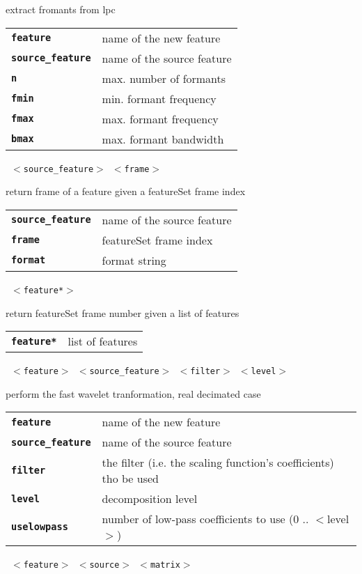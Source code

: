 \begin{description}
\begin{description}
        extract fromants from lpc

      \begin{tabular}{ll}
 \texttt{\textbf{feature}} &         name of the new feature \\
 \texttt{\textbf{source\_feature}} &  name of the source feature \\
 \texttt{\textbf{n}} &                max. number of formants  \\
 \texttt{\textbf{fmin}} &             min. formant frequency  \\
 \texttt{\textbf{fmax}} &             max. formant frequency  \\
 \texttt{\textbf{bmax}} &             max. formant bandwidth  \\
      \end{tabular}
       \texttt{ $<$source\_feature$>$ $<$frame$>$ } \

        return frame of a feature given a featureSet frame index

      \begin{tabular}{ll}
 \texttt{\textbf{source\_feature}} &  name of the source feature \\
 \texttt{\textbf{frame}} &           featureSet frame index  \\
 \texttt{\textbf{format}} &           format string  \\
      \end{tabular}
       \texttt{ $<$feature*$>$} \

        return featureSet frame number given a list of features

      \begin{tabular}{ll}
 \texttt{\textbf{feature*}} & list of features \\
      \end{tabular}
       \texttt{ $<$feature$>$ $<$source\_feature$>$ $<$filter$>$ $<$level$>$ } \

        perform the fast wavelet tranformation, real decimated case

      \begin{tabular}{ll}
 \texttt{\textbf{feature}} &         name of the new feature \\
 \texttt{\textbf{source\_feature}} &  name of the source feature \\
 \texttt{\textbf{filter}} &          the filter (i.e. the scaling function's coefficients) tho be used \\
 \texttt{\textbf{level}} &           decomposition level  \\
 \texttt{\textbf{uselowpass}} &       number of low-pass coefficients to use (0 .. $<$level$>$)  \\
      \end{tabular}
       \texttt{ $<$feature$>$ $<$source$>$ $<$matrix$>$} \


\end{description}
\end{description}
